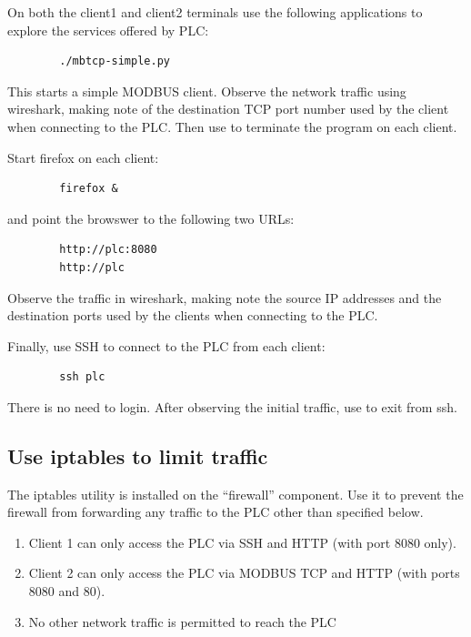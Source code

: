 On both the client1 and client2 terminals use the following applications
to explore the services offered by PLC:

\begin{verbatim}
        ./mbtcp-simple.py
\end{verbatim}
This starts a simple MODBUS client.  Observe the network traffic using
wireshark, making note of the destination TCP port number used by the client when
connecting to the PLC. Then use {\tt <ctrl C>} to terminate the program on each client.

\noindent Start firefox on each client:
\begin{verbatim}
        firefox &
\end{verbatim}
\noindent and point the browswer to the following two URLs:
\begin{verbatim}
        http://plc:8080
        http://plc
\end{verbatim}
\noindent Observe the traffic in wireshark, making note the
source IP addresses and the destination ports used by the 
clients when connecting to the PLC.

\noindent Finally, use SSH to connect to the PLC from each client:
\begin{verbatim}
        ssh plc
\end{verbatim}
\noindent There is no need to login.  After observing the initial traffic,
use {\tt <ctrl C>} to exit from ssh.

\subsection{Use iptables to limit traffic}
The iptables utility is installed on the ``firewall'' component.
Use it to prevent the firewall from forwarding any traffic
to the PLC other than specified below.

\begin{enumerate}
\item Client 1 can only access the PLC via SSH and HTTP 
(with port 8080 only).
\item Client 2 can only access the PLC via MODBUS TCP and HTTP 
(with ports 8080 and 80).
\item No other network traffic is permitted to reach the PLC
\end{enumerate}

